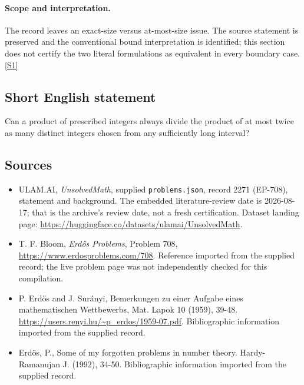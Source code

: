 \documentclass[11pt,a4paper]{article}
\newcommand{\sref}[2]{\hyperlink{source:#1:#2}{[S#2]}}
\begin{document}
\paragraph{Scope and interpretation.}

The record leaves an exact-size versus at-most-size issue. The source statement is preserved and the conventional bound interpretation is identified; this section does not certify the two literal formulations as equivalent in every boundary case. \sref{2271}{1}

\subsection{Short English statement}

Can a product of prescribed integers always divide the product of at most twice as many distinct integers chosen from any sufficiently long interval?

\subsection{Sources}

{\small

\begin{itemize}

\item[\hypertarget{source:2271:1}{S1}] ULAM.AI, \emph{UnsolvedMath}, supplied \texttt{problems.json}, record 2271 (EP-708), statement and background. The embedded literature-review date is 2026-08-17; that is the archive’s review date, not a fresh certification. Dataset landing page: \url{https://huggingface.co/datasets/ulamai/UnsolvedMath}.

\item[\hypertarget{source:2271:2}{S2}] T. F. Bloom, \emph{Erdős Problems}, Problem 708, \url{https://www.erdosproblems.com/708}. Reference imported from the supplied record; the live problem page was not independently checked for this compilation.

\item[\hypertarget{source:2271:3}{S3}] P. Erdős and J. Surányi, Bemerkungen zu einer Aufgabe eines mathematischen Wettbewerbs, Mat. Lapok 10 (1959), 39-48. \url{https://users.renyi.hu/~p_erdos/1959-07.pdf}. Bibliographic information imported from the supplied record.

\item[\hypertarget{source:2271:4}{S4}] Erd\"{o}s, P., Some of my forgotten problems in number theory. Hardy-Ramanujan J. (1992), 34-50. Bibliographic information imported from the supplied record.

\end{itemize}

}

\label{end:2271}
\end{document}
